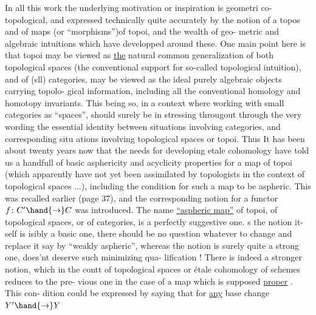 In all this work the underlying motivation or inspiration is geometri%
co-topological,  and expressed technically quite accurately by the notion
of a topos and of maps (or ``morphisms'')of topoi,  and the wealth of geo-%
metric and algebraic intuitions  which have developped around these.
One main point here is that topoi may be viewed as \uline{the} natural common
generalization of both topological spaces (the conventional support for
so-called topological intuition),  and of  (sll) categories,
  may be viewed as the ideal purely algebraic objects carrying topolo-%
gical information,  including all the conventional homology and homotopy
invariants.  This being so, 
in a context where working with small categories as ``spaces'', should
surely be in stressing througout\hand{,} through the very wording\hand{,} the essential
identity between situations involving categories,  and corresponding situ%
ations involving topological spaces or topoi.  Thus It has been about
twenty years now that the  needs for developing etale cohomology
have told us a handfull of basic asphericity and acyclicity properties
for a map of topoi (which apparently have not yet been assimilated by
topologists\hand{,} in the context of  topological spaces ...),  including the
condition for such a map to be aspheric. This was recalled earlier
(page 37),  and the corresponding notion for a functor $f\colon C'\hand{\to}C$  was
introduced.  The name \uline{``aspheric map''} of topoi,  of topological spaces,
or of categories,  is  a perfectly suggestive one.   s the notion it-%
self is isibly a basic one,  there should be no question whatever to
change   and replace it say by ``weakly aspheric'',  whereas the notion
is surely quite a strong one,    does'nt deserve such minimizing qua-%
lification !  There is indeed a stronger notion,  which in the contt
of topological spaces or étale cohomology of schemes reduces to the pre-%
vious one in the  case of a map which is supposed \uline{proper} .  This con-%
dition could be expressed by saying that for \uline{any} base change $Y'\hand{\to}Y$

